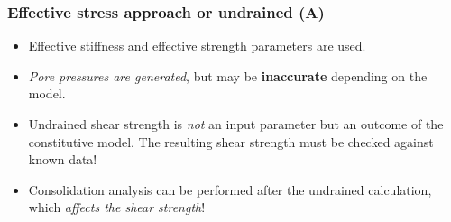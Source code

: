 \documentclass[notes]{beamer}
\begin{document}


\begin{frame}
\frametitle{Effective stress approach or undrained (A)}
\begin{itemize}
	\item Effective stiffness and effective strength parameters are used.
	\item \textit{Pore pressures are generated}, but may be \textbf{inaccurate} depending on the model.
	\item Undrained shear strength is \textit{not} an input parameter but an outcome of the constitutive model. The resulting shear strength must be checked against known data!
	\item Consolidation analysis can be performed after the undrained calculation, which \textit{affects the shear strength}!
\end{itemize}
\end{frame}
\end{document}
